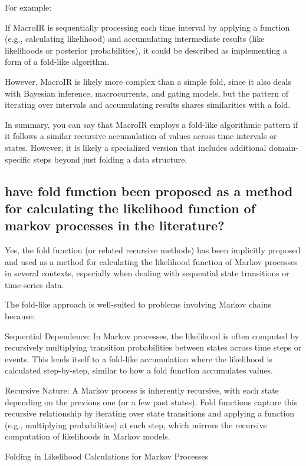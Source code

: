 \documentclass[pdflatex,sn-mathphys-num]{sn-jnl}%
\theoremstyle{thmstyleone}%
\theoremstyle{thmstyletwo}%
\theoremstyle{thmstylethree}%
\begin{document}
For example:

If MacroIR is sequentially processing each time interval by applying a function (e.g., calculating likelihood) and accumulating intermediate results (like likelihoods or posterior probabilities), it could be described as implementing a form of a fold-like algorithm.

However, MacroIR is likely more complex than a simple fold, since it also deals with Bayesian inference, macrocurrents, and gating models, but the pattern of iterating over intervals and accumulating results shares similarities with a fold.

In summary, you can say that MacroIR employs a fold-like algorithmic pattern if it follows a similar recursive accumulation of values across time intervals or states. However, it is likely a specialized version that includes additional domain-specific steps beyond just folding a data structure.


\subsection{have fold function been proposed as a method for calculating the likelihood function of markov processes in the literature?}

Yes, the fold function (or related recursive methods) has been implicitly proposed and used as a method for calculating the likelihood function of Markov processes in several contexts, especially when dealing with sequential state transitions or time-series data.

The fold-like approach is well-suited to problems involving Markov chains because:

Sequential Dependence: In Markov processes, the likelihood is often computed by recursively multiplying transition probabilities between states across time steps or events. This lends itself to a fold-like accumulation where the likelihood is calculated step-by-step, similar to how a fold function accumulates values.

Recursive Nature: A Markov process is inherently recursive, with each state depending on the previous one (or a few past states). Fold functions capture this recursive relationship by iterating over state transitions and applying a function (e.g., multiplying probabilities) at each step, which mirrors the recursive computation of likelihoods in Markov models.

Folding in Likelihood Calculations for Markov Processes
\end{document}
